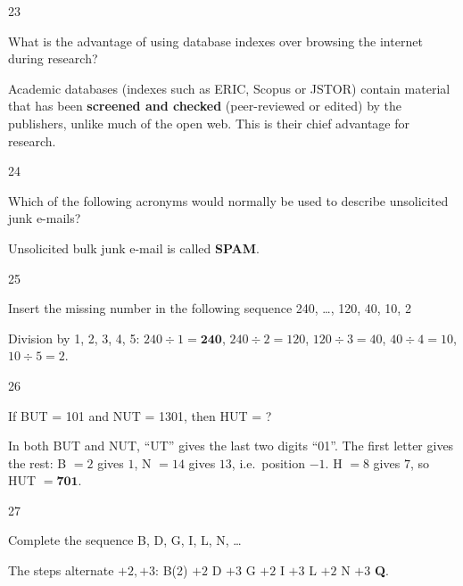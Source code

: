 \begin{question}{23}
{What is the advantage of using database indexes over browsing the internet during research?\par}
\begin{explain}
Academic databases (indexes such as ERIC, Scopus or JSTOR) contain material that has been \textbf{screened and checked} (peer-reviewed or edited) by the publishers, unlike much of the open web. This is their chief advantage for research.
\end{explain}
\end{question}

\begin{question}{24}
{Which of the following acronyms would normally be used to describe unsolicited junk e-mails?\par}
\begin{explain}
Unsolicited bulk junk e-mail is called \textbf{SPAM}.
\end{explain}
\end{question}

\begin{question}{25}
{Insert the missing number in the following sequence 240, \ldots{}, 120, 40, 10, 2\par}
\begin{explain}
Division by 1, 2, 3, 4, 5: $240\div1=\mathbf{240}$, $240\div2=120$, $120\div3=40$, $40\div4=10$, $10\div5=2$.
\end{explain}
\end{question}

\begin{question}{26}
{If BUT = 101 and NUT = 1301, then HUT = ?\par}
\begin{explain}
In both BUT and NUT, ``UT'' gives the last two digits ``01''. The first letter gives the rest: B $=2$ gives $1$, N $=14$ gives $13$, i.e.\ position $-1$. H $=8$ gives $7$, so HUT $=\mathbf{701}$.
\end{explain}
\end{question}

\begin{question}{27}
{Complete the sequence B, D, G, I, L, N, \ldots{}\par}
\begin{explain}
The steps alternate $+2, +3$: B(2) $+2$ D $+3$ G $+2$ I $+3$ L $+2$ N $+3$ \textbf{Q}.
\end{explain}
\end{question}

